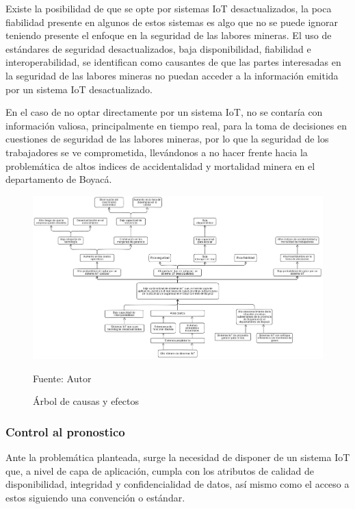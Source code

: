 \documentclass[stu,12pt,floatsintext]{apa7}
\begin{document}
	Existe la posibilidad de que se opte por sistemas IoT desactualizados, la poca fiabilidad presente en algunos de estos sistemas es algo que no se puede ignorar teniendo presente el enfoque en la seguridad de las labores mineras. El uso de estándares de seguridad desactualizados, baja disponibilidad, fiabilidad e interoperabilidad, se identifican como causantes de que las partes interesadas en la seguridad de las labores mineras no puedan acceder a la información emitida por un sistema IoT desactualizado. 
	
	En el caso de no optar directamente por un sistema IoT, no se contaría con información valiosa, principalmente en tiempo real, para la toma de decisiones en cuestiones de seguridad de las labores mineras, por lo que la seguridad de los trabajadores se ve comprometida, llevándonos a no hacer frente hacia la problemática de altos indices de accidentalidad y mortalidad minera en el departamento de Boyacá\cite{anm2020}.
		\begin{figure}[H]
		\centering
		\includegraphics[scale=0.142]{arbol-causas-efectos}
		\captionsetup{justification=centering}
		\caption{Árbol de causas y efectos}
		\small
		Fuente: Autor
	\end{figure}
	
	\subsubsection{Control al pronostico}
	Ante la problemática planteada, surge la necesidad de disponer de un sistema IoT que, a nivel de capa de aplicación, cumpla con los atributos de calidad de disponibilidad, integridad y confidencialidad de datos, así mismo como el acceso a estos siguiendo una convención o estándar.
	
\end{document}
